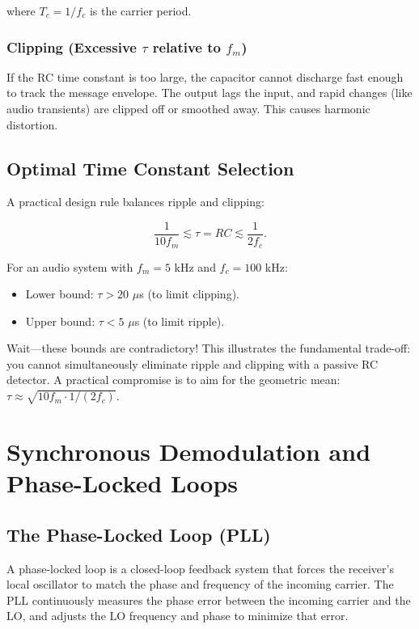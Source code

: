\documentclass[11pt,letterpaper]{article}
\begin{document}
\noindent
where $T_c = 1/f_c$ is the carrier period.

\subsubsection*{Clipping (Excessive $\tau$ relative to $f_m$)}

If the RC time constant is too large, the capacitor cannot discharge fast enough to track the message envelope. The output lags the input, and rapid changes (like audio transients) are clipped off or smoothed away. This causes harmonic distortion.

\subsection{Optimal Time Constant Selection}

A practical design rule balances ripple and clipping:

\begin{equation}
\frac{1}{10 f_m} \lesssim \tau = RC \lesssim \frac{1}{2 f_c}.
\end{equation}

\noindent
For an audio system with $f_m = 5$ kHz and $f_c = 100$ kHz:
\begin{itemize}
    \item Lower bound: $\tau > 20$ $\mu$s (to limit clipping).
    \item Upper bound: $\tau < 5$ $\mu$s (to limit ripple).
\end{itemize}

\noindent
Wait—these bounds are contradictory! This illustrates the fundamental trade-off: you cannot simultaneously eliminate ripple and clipping with a passive RC detector. A practical compromise is to aim for the geometric mean: $\tau \approx \sqrt{10 f_m \cdot 1/(2 f_c)}$.

\section{Synchronous Demodulation and Phase-Locked Loops}

\subsection{The Phase-Locked Loop (PLL)}

A phase-locked loop is a closed-loop feedback system that forces the receiver's local oscillator to match the phase and frequency of the incoming carrier. The PLL continuously measures the phase error between the incoming carrier and the LO, and adjusts the LO frequency and phase to minimize that error.
\end{document}
